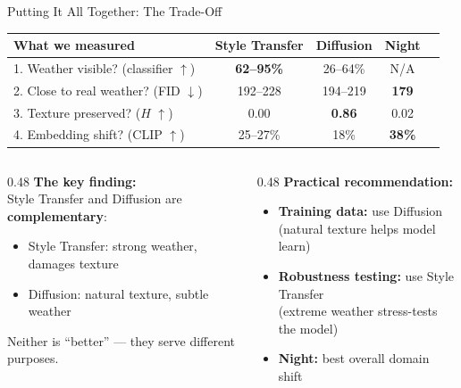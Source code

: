 \documentclass[aspectratio=169, 11pt]{beamer}
\begin{document}

\begin{frame}{Putting It All Together: The Trade-Off}

\centering
\footnotesize
\begin{tabular}{lcccc}
\toprule
\textbf{What we measured} & \textbf{Style Transfer} & \textbf{Diffusion} & \textbf{Night} \\
\midrule
1. Weather visible? (classifier $\uparrow$) & \textbf{62--95\%} & 26--64\% & N/A \\
2. Close to real weather? (FID $\downarrow$) & 192--228 & 194--219 & \textbf{179} \\
3. Texture preserved? ($H$ $\uparrow$) & 0.00 & \textbf{0.86} & 0.02 \\
4. Embedding shift? (CLIP $\uparrow$) & 25--27\% & 18\% & \textbf{38\%} \\
\bottomrule
\end{tabular}

\vspace{0.8em}
\raggedright
\begin{columns}[T]
\begin{column}{0.48\textwidth}
\textbf{The key finding:}\\[0.2em]
Style Transfer and Diffusion are \textbf{complementary}:
\begin{itemize}\setlength\itemsep{0.1em}
    \item Style Transfer: strong weather, damages texture
    \item Diffusion: natural texture, subtle weather
\end{itemize}
Neither is ``better'' --- they serve different purposes.
\end{column}
\begin{column}{0.48\textwidth}
\textbf{Practical recommendation:}
\begin{itemize}\setlength\itemsep{0.1em}
    \item \textbf{Training data:} use Diffusion\\(natural texture helps model learn)
    \item \textbf{Robustness testing:} use Style Transfer\\(extreme weather stress-tests the model)
    \item \textbf{Night:} best overall domain shift
\end{itemize}
\end{column}
\end{columns}
\end{frame}
\end{document}
